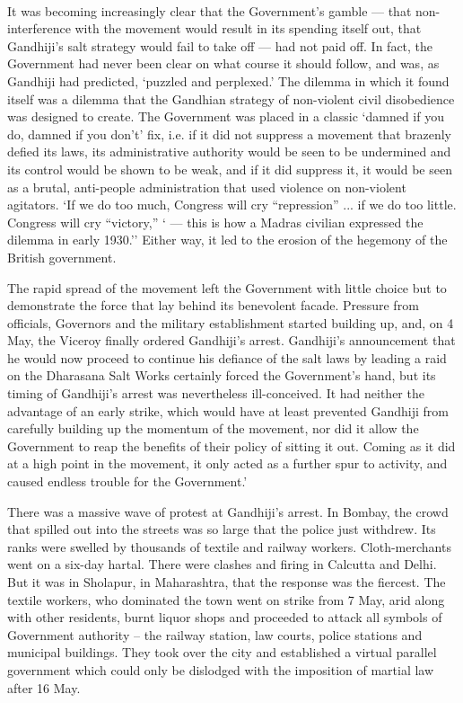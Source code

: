\begin{multicols}{2}
\paragraph*{}
It was becoming increasingly clear that the Government's gamble --- that non-interference with the movement would result in its spending itself out, that Gandhiji's salt strategy would fail to take off --- had not paid off. In fact, the Government had never been clear on what course it should follow, and was, as Gandhiji had predicted, `puzzled and perplexed.' The dilemma in which it found itself was a dilemma that the Gandhian strategy of non-violent civil disobedience was designed to create. The Government was placed in a classic `damned if you do, damned if you don't' fix, i.e. if it did not suppress a movement that brazenly defied its laws, its administrative authority would be seen to be undermined and its control would be shown to be weak, and if it did suppress it, it would be seen as a brutal, anti-people administration that used violence on non-violent agitators. `If we do too much, Congress will cry ``repression'' ... if we do too little. Congress will cry ``victory,'' ` --- this is how a Madras civilian expressed the dilemma in early 1930.'' Either way, it led to the erosion of the hegemony of the British government.

The rapid spread of the movement left the Government with little choice but to demonstrate the force that lay behind its benevolent facade. Pressure from officials, Governors and the military establishment started building up, and, on 4 May, the Viceroy finally ordered Gandhiji's arrest. Gandhiji's announcement that he would now proceed to continue his defiance of the salt laws by leading a raid on the Dharasana Salt Works certainly forced the Government's hand, but its timing of Gandhiji's arrest was nevertheless ill-conceived. It had neither the advantage of an early strike, which would have at least prevented Gandhiji from carefully building up the momentum of the movement, nor did it allow the Government to reap the benefits of their policy of sitting it out. Coming as it did at a high point in the movement, it only acted as a further spur to activity, and caused endless trouble for the Government.'

There was a massive wave of protest at Gandhiji's arrest. In Bombay, the crowd that spilled out into the streets was so large that the police just withdrew. Its ranks were swelled by thousands of textile and railway workers. Cloth-merchants went on a six-day hartal. There were clashes and firing in Calcutta and Delhi. But it was in Sholapur, in Maharashtra, that the response was the fiercest. The textile workers, who dominated the town went on strike from 7 May, arid along with other residents, burnt liquor shops and proceeded to attack all symbols of Government authority -- the railway station, law courts, police stations and municipal buildings. They took over the city and established a virtual parallel government which could only be dislodged with the imposition of martial law after 16 May.


\end{multicols}

